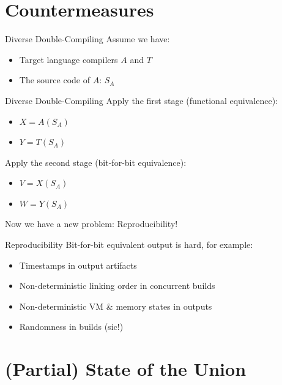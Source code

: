 \documentclass[12pt]{beamer}
\begin{document}
  \section{Countermeasures}

  \begin{frame}{Diverse Double-Compiling}
    Assume we have:

    \begin{itemize}
    \item Target language compilers $A$ and $T$
    \item The source code of $A$: $ S_{A} $
    \end{itemize}
  \end{frame}

  \begin{frame}{Diverse Double-Compiling}
    Apply the first stage (functional equivalence):

    \begin{itemize}
    \item $ X = A(S_{A})$
    \item $ Y = T(S_{A})$
    \end{itemize}

    Apply the second stage (bit-for-bit equivalence):

    \begin{itemize}
    \item $ V = X(S_{A})$
    \item $ W = Y(S_{A})$
    \end{itemize}

    Now we have a new problem: Reproducibility!
  \end{frame}

  \begin{frame}{Reproducibility}
    Bit-for-bit equivalent output is hard, for example:

    \begin{itemize}
    \item Timestamps in output artifacts
    \item Non-deterministic linking order in concurrent builds
    \item Non-deterministic VM \& memory states in outputs
    \item Randomness in builds (sic!)
    \end{itemize}
  \end{frame}

  \section{(Partial) State of the Union}
\end{document}
